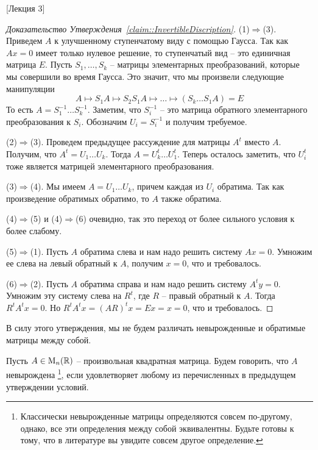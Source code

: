 [Лекция 3]


\begin{proof}
[Доказательство Утверждения~\ref{claim::InvertibleDiscription}]
(1)$\Rightarrow$(3).
Приведем $A$ к улучшенному ступенчатому виду с помощью Гаусса.
Так как $Ax = 0$ имеет только нулевое решение, то ступенчатый вид -- это единичная матрица $E$.
Пусть $S_1, \ldots, S_k$ -- матрицы элементарных преобразований, которые мы совершили во время Гаусса.
Это значит, что мы произвели следующие манипуляции
\[
A \mapsto S_1 A \mapsto S_2 S_1 A \mapsto \ldots \mapsto (S_k \ldots S_1 A) = E
\]
То есть $A = S_1^{-1}\ldots S_k^{-1}$.
Заметим, что $S_i^{-1}$ -- это матрица обратного элементарного преобразования к $S_i$.
Обозначим $U_i = S_i^{-1}$ и получим требуемое.

(2)$\Rightarrow$(3).
Проведем предыдущее рассуждение для матрицы $A^t$ вместо $A$.
Получим, что $A^t = U_1\ldots U_k$.
Тогда $A = U_k^t \ldots U_1^t$.
Теперь осталось заметить, что $U_i^t$ тоже является матрицей элементарного преобразования.

(3)$\Rightarrow$(4).
Мы имеем $A=U_1\ldots U_k$, причем каждая из $U_i$ обратима.
Так как произведение обратимых обратимо, то $A$ также обратима.

(4)$\Rightarrow$(5) и (4)$\Rightarrow$(6) очевидно, так это переход от более сильного условия к более слабому.

(5)$\Rightarrow$(1).
Пусть $A$ обратима слева и нам надо решить систему $Ax = 0$.
Умножим ее слева на левый обратный к $A$, получим $x = 0$, что и требовалось.

(6)$\Rightarrow$(2).
Пусть $A$ обратима справа и нам надо решить систему $A^ty = 0$.
Умножим эту систему слева на $R^t$, где $R$ -- правый обратный к $A$.
Тогда $R^t A^t x = 0$.
Но $R^t A^t x = (AR)^tx = Ex = x = 0$, что и требовалось.
\end{proof}

В силу этого утверждения, мы не будем различать невырожденные и обратимые матрицы между собой.

\begin{definition}
Пусть $A\in\operatorname{M}_{n}(\mathbb R)$ -- произвольная квадратная матрица.
Будем говорить, что $A$ невырождена%
\footnote{Классически невырожденные матрицы определяются совсем по-другому, однако, все эти определения между собой эквивалентны.
Будьте готовы к тому, что в литературе вы увидите совсем другое определение.},
если удовлетворяет любому из перечисленных в предыдущем утверждении условий.
\end{definition}


